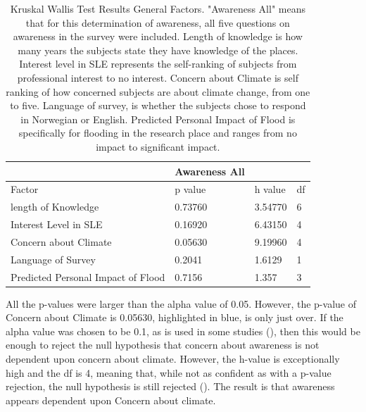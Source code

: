 \begin{table}[H]
    \centering
    \begin{tabular}{|l|l|l|l|}
    \hline
         ~ & \textbf{Awareness All} & ~ & ~ \\ \hline
        Factor & p value & h value & df \\ \hline
           length of Knowledge & 0.73760 & 3.54770 & 6 \\ \hline
       Interest Level in SLE & 0.16920 & 6.43150 & 4 \\ \hline
        Concern about Climate & \cellcolor[HTML]{7df9ff} 0.05630 & \cellcolor[HTML]{7df9ff} 9.19960 & \cellcolor[HTML]{7df9ff} 4 \\ \hline
        Language of Survey & 0.2041 & 1.6129 & 1 \\ \hline
        Predicted Personal Impact of Flood & 0.7156 & 1.357 & 3 \\ \hline
    \end{tabular}
    \caption{Kruskal Wallis Test Results General Factors. "Awareness All" means that for this determination of awareness, all five questions on awareness in the survey were included. Length of knowledge is how many years the subjects state they have knowledge of the places. Interest level in SLE represents the self-ranking of subjects from professional interest to no interest. Concern about Climate is self ranking of how concerned subjects are about climate change, from one to five. Language of survey, is whether the subjects chose to respond in Norwegian or English. Predicted Personal Impact of Flood is specifically for flooding in the research place and ranges from no impact to significant impact. }
    \label{Kruskal_wallis_test_general}
\end{table}

All the p-values were larger than the alpha value of 0.05. However, the p-value of Concern about Climate is 0.05630, highlighted in blue, is only just over.  If the alpha value was chosen to be 0.1, as is used in some studies (\cite{hollander_nonparametric_2014}), then this would be enough to reject the null hypothesis that concern about awareness is not dependent upon concern about climate. However, the h-value is exceptionally high and the df is 4, meaning that, while not as confident as with a p-value rejection, the null hypothesis is still rejected (\cite{minitab_interpret_2022}). The result is that awareness appears dependent upon Concern about climate. 
\paragraph{}


